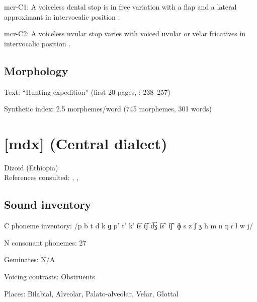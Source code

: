 {\begin{appendixdesc}
\item[mcr-C1:] A voiceless dental stop is in free variation with a flap and a lateral approximant in intervocalic position \citep[9]{Whitehead2004}.

\item[mcr-C2:] A voiceless uvular stop varies with voiced uvular or velar fricatives in intervocalic position \citep[9]{Whitehead2004}.
\end{appendixdesc}
\subsection*{Morphology}

\begin{appendixdesc}

\item[Text:] “Hunting expedition” (first 20 pages, \citealt{Whitehead2004}: 238--257)

\item[Synthetic index:] 2.5 morphemes/word (745 morphemes, 301 words)
\end{appendixdesc}
\section*{[mdx]  (Central dialect)}  %
Dizoid (Ethiopia)\medskip\\
References consulted: \citet{Allan1976}, \citet{Beachy2005}, \citet{Breeze1988}

\subsection*{Sound inventory}
\begin{appendixdesc}

\item[C phoneme inventory:] /p b t d k ɡ p’ t’ k’ t͡s t͡ʃ d͡ʒ t͡s’ t͡ʃ’ ɸ s z ʃ ʒ h m n ŋ ɾ l w j/

\item[N consonant phonemes:] 27

\item[Geminates:] N/A

\item[Voicing contrasts:] Obstruents

\item[Places:] Bilabial, Alveolar, Palato-alveolar, Velar, Glottal


\end{appendixdesc}}
